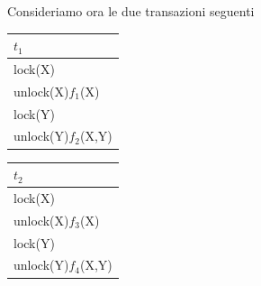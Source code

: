 \noindent Consideriamo ora le due transazioni seguenti
\begin{multicols}{2}  

 \begin{tabular}{|l|}
   \hline
   $t_1$\\
   \hline
   lock(X)\\ 
   unlock(X)$f_1$(X)\\ 
   lock(Y)\\ 
   unlock(Y)$f_2$(X,Y)\\ 
  \hline
 \end{tabular}
 
 \begin{tabular}{|l|}
  \hline
   $t_2$\\
   \hline
   lock(X)\\
   unlock(X)$f_3$(X)\\
   lock(Y)\\
   unlock(Y)$f_4$(X,Y)\\
  \hline
  \end{tabular} 
 \end{multicols}


